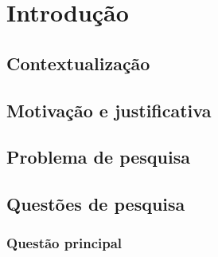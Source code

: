 
\chapter{Introdução}
\label{ch:introducao}


\section{Contextualização}

\section{Motivação e justificativa}

\section{Problema de pesquisa}

\section{Questões de pesquisa}

\subsection{Questão principal}

